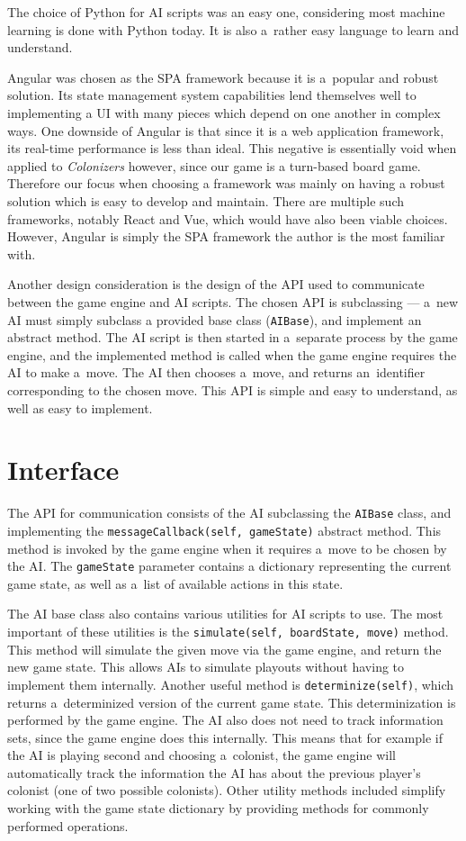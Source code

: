 The choice of Python for AI scripts was an easy one, considering most machine learning
is done with Python today. It is also a~rather easy language to learn and understand.

Angular was chosen as the SPA framework because it is a~popular and robust solution.
Its state management system capabilities lend themselves well to implementing
a UI with many pieces which depend on one another in complex ways.
One downside of Angular is that since it is a web application framework,
its real-time performance is less than ideal. This negative is essentially void
when applied to \emph{Colonizers} however, since our game is a turn-based board game.
Therefore our focus when choosing a framework was mainly on having a robust
solution which is easy to develop and maintain.
There are multiple such frameworks, notably React and Vue, which would have also
been viable choices. However, Angular is simply the SPA framework the author
is the most familiar with.

Another design consideration is the design of the API used to communicate between
the game engine and AI scripts. The chosen API is subclassing --- a~new AI
must simply subclass a provided base class (\texttt{AIBase}), and implement
an abstract method. The AI script is then started in a~separate process
by the game engine, and the implemented method is called when the game engine
requires the AI to make a~move. The AI then chooses a~move, and returns an~identifier
corresponding to the chosen move. This API is simple and easy to understand,
as well as easy to implement.

\section{Interface}

The API for communication consists of the AI subclassing the \texttt{AIBase} class,
and implementing the \texttt{messageCallback(self, gameState)} abstract method. This method
is invoked by the game engine when it requires a~move to be chosen by the AI. The
\texttt{gameState} parameter contains a dictionary representing the current game state,
as well as a~list of available actions in this state.

The AI base class also contains various utilities for AI scripts to use. The most
important of these utilities is the \texttt{simulate(self, boardState, move)} method.
This method will simulate the given move via the game engine, and return the new game state.
This allows AIs to simulate playouts without having to implement them internally.
Another useful method is \texttt{determinize(self)}, which returns a~determinized
version of the current game state. This determinization is performed by the game
engine. The AI also does not need to track information sets, since the game engine
does this internally. This means that for example if the AI is playing second and
choosing a~colonist, the game engine will automatically track the information the AI
has about the previous player's colonist (one of two possible colonists).
Other utility methods included simplify working with the game state dictionary by
providing methods for commonly performed operations.

